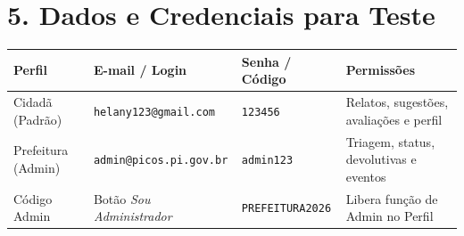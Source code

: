 \documentclass[12pt,a4paper]{article}
\begin{document}
\section*{5. Dados e Credenciais para Teste}
\begin{table}[h!]
\centering
\renewcommand{\arraystretch}{1.25}
\begin{tabular}{llll}
\toprule
\textbf{Perfil} & \textbf{E-mail / Login} & \textbf{Senha / Código} & \textbf{Permissões} \\
\midrule
Cidadã (Padrão) & \texttt{helany123@gmail.com} & \texttt{123456} & Relatos, sugestões, avaliações e perfil \\
Prefeitura (Admin) & \texttt{admin@picos.pi.gov.br} & \texttt{admin123} & Triagem, status, devolutivas e eventos \\
Código Admin & Botão \textit{Sou Administrador} & \texttt{PREFEITURA2026} & Libera função de Admin no Perfil \\
\bottomrule
\end{tabular}
\end{table}
\end{document}

